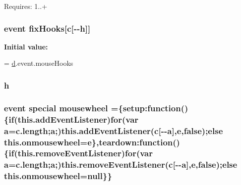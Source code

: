 Requires\+: 1..+ \hypertarget{jquery_8mousewheel-3_80_86_8pack_8js_a4b5c480977826b4df036a480ae718080}{
\subsubsection[{fix\+Hooks}]{ event fix\+Hooks\mbox{[}{\bf c}\mbox{[}-\/-\/{\bf h}\mbox{]}\mbox{]}}}\label{jquery_8mousewheel-3_80_86_8pack_8js_a4b5c480977826b4df036a480ae718080}
{\bfseries Initial value\+:}
\begin{DoxyCode}
=
\hyperlink{jquery_8mousewheel-3_80_86_8pack_8js_a36541169dfff685f807208881a4f0021}{d}.event.mouseHooks
\end{DoxyCode}
\hypertarget{jquery_8mousewheel-3_80_86_8pack_8js_a5e36941b3d856737e81516acd45edc50}{
\subsubsection[{h}]{\setlength{\rightskip}{0pt plus 5cm}h}}\label{jquery_8mousewheel-3_80_86_8pack_8js_a5e36941b3d856737e81516acd45edc50}
\hypertarget{jquery_8mousewheel-3_80_86_8pack_8js_a5cacd7cde5bcced7713078ec4fad27fd}{
\subsubsection[{mousewheel}]{ event {\bf special} mousewheel =\{setup\+:function()\{{\bf if}(this.\+add\+Event\+Listener){\bf for}(var {\bf a}=c.\+length;{\bf a};)this.\+add\+Event\+Listener({\bf c}\mbox{[}-\/-\/{\bf a}\mbox{]},{\bf e},{\bf false});{\bf else} this.\+onmousewheel={\bf e}\},teardown\+:function()\{{\bf if}(this.\+remove\+Event\+Listener){\bf for}(var {\bf a}=c.\+length;{\bf a};)this.\+remove\+Event\+Listener({\bf c}\mbox{[}-\/-\/{\bf a}\mbox{]},{\bf e},{\bf false});{\bf else} this.\+onmousewheel={\bf null}\}\}}}\label{jquery_8mousewheel-3_80_86_8pack_8js_a5cacd7cde5bcced7713078ec4fad27fd}

